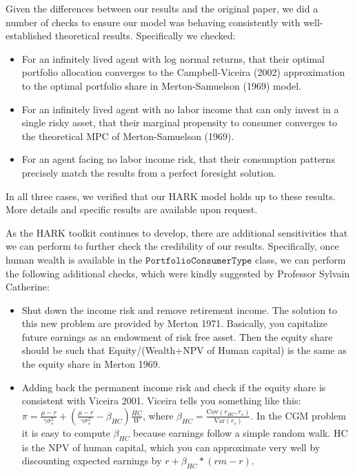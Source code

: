 \documentclass[./CGMPortfolio.tex]{subfiles}
\begin{document}
Given the differences between our results and the original paper, we did a number of checks to ensure our model was behaving consistently with well-established theoretical results. Specifically we checked:
\begin{itemize}
	\item For an infinitely lived agent with log normal returns, that their optimal portfolio allocation converges to the Campbell-Viceira (2002) approximation to the optimal portfolio share in Merton-Samuelson (1969) model.
	\item For an infinitely lived agent with no labor income that can only invest in a single risky asset, that their marginal propensity to consumer converges to the theoretical MPC of Merton-Samuelson (1969).
	\item For an agent facing no labor income risk, that their consumption patterns precisely match the results from a perfect foresight solution.
\end{itemize}

In all three cases, we verified that our HARK model holds up to these results. More details and specific results are available upon request. 

As the HARK toolkit continues to develop, there are additional sensitivities that we can perform to further check the credibility of our results. Specifically, once human wealth is available in the $\texttt{PortfolioConsumerType}$ class, we can perform the following additional checks, which were kindly suggested by Professor Sylvain Catherine:
\begin{itemize}
	\item Shut down the income risk and remove retirement income. The solution to this new problem are provided by Merton 1971. Basically, you capitalize future earnings as an endowment of risk free asset. Then the equity share should be such that Equity/(Wealth+NPV of Human capital) is the same as the equity share in Merton 1969.
	\item Adding back the permanent income risk and check if the equity share is consistent with Viceira 2001. Viceira tells you something like this: $\pi = \frac{\mu - r}{\gamma \sigma^2_s} + \left(\frac{\mu - r}{\gamma \sigma^2_s} - \beta_{HC} \right) \frac{HC}{W}$, where $\beta_{HC} = \frac{\text{Cov}(r_{HC},r_s)}{\text{Var}(r_s)}$. In the CGM problem it is easy to compute $\beta_{HC}$ because earnings follow a simple random walk. HC is the NPV of human capital, which you can approximate very well by discounting expected earnings by $r+\beta_{HC}*(rm-r)$.
\end{itemize}

\clearpage\vfill\eject

\onlyinsubfile{}
\end{document}
